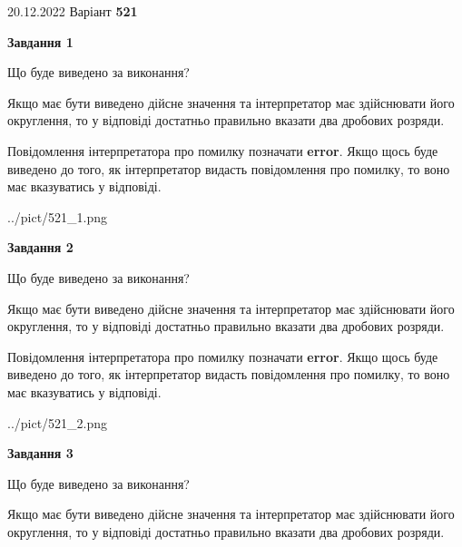 \documentclass[12pt, ukrainian]{article}
\begin{document}
{20.12.2022 Варіант \No \textbf { 521 }\par}
{
\begin {Large}

{\begin {center}\textbf{Завдання 1}\end {center}}\par
Що буде виведено за виконання? \par

Якщо має бути виведено дійсне значення та інтерпретатор має здійснювати його округлення, 
то у відповіді достатньо правильно вказати два дробових розряди.

Повідомлення інтерпретатора про помилку позначати \textbf{error}.
Якщо щось буде виведено до того, як інтерпретатор видасть повідомлення про помилку, 
то воно має вказуватись у відповіді. \par

\begin{center}
	{../pict/521_1.png}
\end{center}
\newpage

{\begin {center}\textbf{Завдання 2}\end {center}}\par
Що буде виведено за виконання? \par

Якщо має бути виведено дійсне значення та інтерпретатор має здійснювати його округлення, 
то у відповіді достатньо правильно вказати два дробових розряди.

Повідомлення інтерпретатора про помилку позначати \textbf{error}.
Якщо щось буде виведено до того, як інтерпретатор видасть повідомлення про помилку, 
то воно має вказуватись у відповіді. \par

\begin{center}
	{../pict/521_2.png}
\end{center}
\newpage

{\begin {center}\textbf{Завдання 3}\end {center}}\par
Що буде виведено за виконання? \par

Якщо має бути виведено дійсне значення та інтерпретатор має здійснювати його округлення, 
то у відповіді достатньо правильно вказати два дробових розряди.


\end{Large}}
\end{document}
